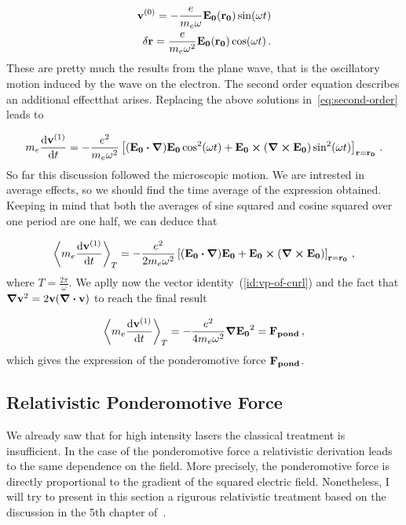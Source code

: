 \documentclass[12pt, class=report, crop=false]{standalone}
\begin{document}
\begin{subequations}
  \begin{align}
    \vb{v}^{(0)} = - \frac{e}{m_e \omega} \vb{E_0}(\vb{r_0}) \sin(\omega t)\\
    \delta \vb{r} = \frac{e}{m_e \omega^2} \vb{E_0}(\vb{r_0}) \cos(\omega t)\,.
  \end{align}
\end{subequations}
These are pretty much the results from the plane wave, that is the oscillatory motion induced by the wave on the electron. The second order equation describes an additional effectthat arises. Replacing the above solutions in~\cref{eq:second-order} leads to

\begin{equation}
    m_e\dv{\vb{v}^{(1)}}{t} = - \frac{e^2}{m_e \omega^2} \left[ (\vb{E_0}\vdot\grad)\vb{E_0}\cos[2](\omega t) + \vb{E_0}\cp\left(\curl{\vb{E_0}}\right)\sin[2](\omega t) \right]_{\vb{r}=\vb{r_0}}\,.
\end{equation}
So far this discussion followed the microscopic motion. We are intrested in average effects, so we should find the time average of the expression obtained. Keeping in mind that both the averages of sine squared and cosine squared over one period are one half, we can deduce that

\begin{equation}
  \expval{m_e\dv{\vb{v}^{(1)}}{t}}_T =  - \frac{e^2}{2 m_e \omega^2} \left[ (\vb{E_0}\vdot\grad)\vb{E_0} + \vb{E_0}\cp\left(\curl{\vb{E_0}}\right)\right]_{\vb{r}=\vb{r_0}}\,,
\end{equation}
where \(T=\frac{2\pi}{\omega}\).
We aplly now the vector identity~(\ref{id:vp-of-curl}) and the fact that \(\grad{\vb{v}^2} = 2\vb{v}(\div{\vb{v}})\) to reach the final result

\begin{equation}
  \expval{m_e\dv{\vb{v}^{(1)}}{t}}_T = - \frac{e^2}{4 m_e \omega^2} \grad{\vb{E_0}^2} = \vb{F_{pond}}\,,
\end{equation}
which gives the expression of the ponderomotive force \(\vb{F_{pond}}\).

\subsection{Relativistic Ponderomotive Force}

We already saw that for high intensity lasers the classical treatment is insufficient. In the case of the ponderomotive force a relativistic derivation leads to the same dependence on the field. More precisely, the ponderomotive force is directly proportional to the gradient of the squared electric field. Nonetheless, I will try to present in this section a rigurous relativistic treatment based on the discussion in the 5th chapter of~\cite{mulserHighPowerLasermatter2010}.
\end{document}
